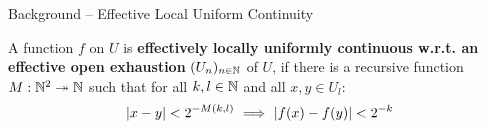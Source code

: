 \begin{frame}{Background -- Effective Local Uniform Continuity}
    \begin{definition}
        A function $f$ on $U$ is \textbf{ effectively locally uniformly continuous \textbf{\textcolor{BrickRed}{w.r.t.\null{} an effective open exhaustion}}} $(U_n)_{n \in \mathbb{N}}$ of $U$, \pause if there is a recursive function $M:\mathbb{N}^2\twoheadrightarrow \mathbb{N}$ such that for all $k,l \in \mathbb{N}$ and all $x,y \in U_l$:
        \[
        {\lvert x-y\rvert}<2^{-M(k,l)} \ \Longrightarrow \  {\lvert f(x)-f(y)\rvert}<2^{-k}
        \]    
    \end{definition}
\end{frame}